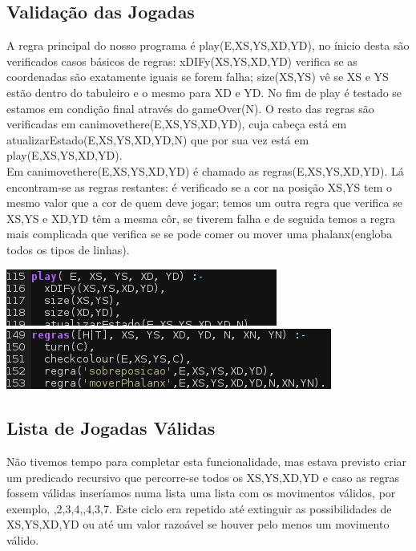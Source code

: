 \documentclass[a4paper]{article}
\begin{document}
\subsection{Validação das Jogadas}
A regra principal do nosso programa é play(E,XS,YS,XD,YD), no ínicio desta são verificados casos básicos de regras: xDIFy(XS,YS,XD,YD) verifica se as coordenadas são exatamente iguais se forem falha; size(XS,YS) vê se XS e YS estão dentro do tabuleiro e o mesmo para XD e YD. No fim de play é testado se estamos em condição final através do gameOver(N). O resto das regras são verificadas em canimovethere(E,XS,YS,XD,YD), cuja cabeça está em atualizarEstado(E,XS,YS,XD,YD,N) que por sua vez está em play(E,XS,YS,XD,YD).
\\\linebreak
Em canimovethere(E,XS,YS,XD,YD) é chamado as regras(E,XS,YS,XD,YD). Lá encontram-se as regras restantes: é verificado se a cor na posição XS,YS tem o mesmo valor que a cor de quem deve jogar; temos um outra regra que verifica se XS,YS e XD,YD têm a mesma côr, se tiverem falha e de seguida temos a regra mais complicada que verifica se se pode comer ou mover uma phalanx(engloba todos os tipos de linhas).
\begin{center}
\includegraphics[scale=0.70]{regras1.png}
\includegraphics[scale=0.70]{regras.png}
\end{center}

\subsection{Lista de Jogadas Válidas}
Não tivemos tempo para completar esta funcionalidade, mas estava previsto criar um predicado recursivo que percorre-se todos os XS,YS,XD,YD e caso as regras fossem válidas inseríamos numa lista uma lista com os movimentos válidos, por exemplo, \lbrack{},2,3,4\rbrack,,4,3,7\rbrack\rbrack. Este ciclo era repetido até extinguir as possibilidades de XS,YS,XD,YD ou até um valor razoável se houver pelo menos um movimento válido.
\end{document}
